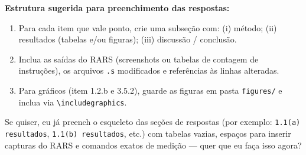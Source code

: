 \documentclass[12pt,a4paper]{article}
\begin{document}
\bigskip
\noindent\textbf{Estrutura sugerida para preenchimento das respostas:}
\begin{enumerate}
    \item Para cada item que vale ponto, crie uma subseção com: (i) método; (ii) resultados (tabelas e/ou figuras); (iii) discussão / conclusão.
    \item Inclua as saídas do RARS (screenshots ou tabelas de contagem de instruções), os arquivos \texttt{.s} modificados e referências às linhas alteradas.
    \item Para gráficos (item 1.2.b e 3.5.2), guarde as figuras em pasta \texttt{figures/} e inclua via \verb|\includegraphics|.
\end{enumerate}

\bigskip
\noindent Se quiser, eu já preench o esqueleto das seções de respostas (por exemplo: \texttt{1.1(a) resultados}, \texttt{1.1(b) resultados}, etc.) com tabelas vazias, espaços para inserir capturas do RARS e comandos exatos de medição — quer que eu faça isso agora?
\end{document}
